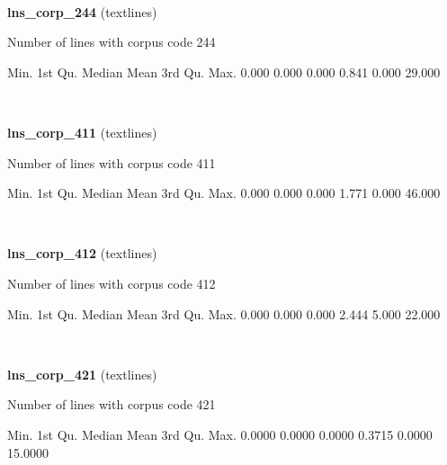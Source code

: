 \documentclass[]{article}
\newenvironment{Shaded}{\begin{snugshade}}{\end{snugshade}}
\newcommand{\FloatTok}[1]{\textcolor[rgb]{0.00,0.00,0.81}{{#1}}}
\newcommand{\NormalTok}[1]{{#1}}
\begin{document}
~

\vspace{1em}

\textbf{lns\_corp\_244} (textlines)

Number of lines with corpus code 244

\begin{Shaded}
\begin{Highlighting}[]
   \NormalTok{Min. 1st Qu.  Median    Mean 3rd Qu.    Max. }
  \FloatTok{0.000}   \FloatTok{0.000}   \FloatTok{0.000}   \FloatTok{0.841}   \FloatTok{0.000}  \FloatTok{29.000} 
\end{Highlighting}
\end{Shaded}

~

\vspace{1em}

\textbf{lns\_corp\_411} (textlines)

Number of lines with corpus code 411

\begin{Shaded}
\begin{Highlighting}[]
   \NormalTok{Min. 1st Qu.  Median    Mean 3rd Qu.    Max. }
  \FloatTok{0.000}   \FloatTok{0.000}   \FloatTok{0.000}   \FloatTok{1.771}   \FloatTok{0.000}  \FloatTok{46.000} 
\end{Highlighting}
\end{Shaded}

~

\vspace{1em}

\textbf{lns\_corp\_412} (textlines)

Number of lines with corpus code 412

\begin{Shaded}
\begin{Highlighting}[]
   \NormalTok{Min. 1st Qu.  Median    Mean 3rd Qu.    Max. }
  \FloatTok{0.000}   \FloatTok{0.000}   \FloatTok{0.000}   \FloatTok{2.444}   \FloatTok{5.000}  \FloatTok{22.000} 
\end{Highlighting}
\end{Shaded}

~

\vspace{1em}

\textbf{lns\_corp\_421} (textlines)

Number of lines with corpus code 421

\begin{Shaded}
\begin{Highlighting}[]
   \NormalTok{Min. 1st Qu.  Median    Mean 3rd Qu.    Max. }
 \FloatTok{0.0000}  \FloatTok{0.0000}  \FloatTok{0.0000}  \FloatTok{0.3715}  \FloatTok{0.0000} \FloatTok{15.0000} 
\end{Highlighting}
\end{Shaded}
\end{document}
